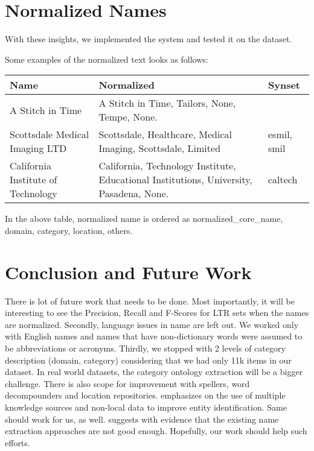 \documentclass{acm_proc_article-sp}
\begin{document}
\section{Normalized Names}
With these insights, we implemented the system and tested it on the dataset. 

Some examples of the normalized text looks as follows:

\begin{center}
  \begin{tabular}{ |p{2cm} | p{3cm} | p{2cm} | }
    \hline
    Name & Normalized & Synset \\ \hline
    A Stitch in Time & A Stitch in Time, Tailors, None, Tempe, None. &  \\ \hline
    Scottsdale Medical Imaging LTD & Scottsdale, Healthcare, Medical  Imaging, Scottsdale, Limited & esmil, smil  \\ \hline
    California Institute of Technology & California, Technology Institute, Educational Institutions, University, Pasadena, None. & caltech \\ \hline
  \end{tabular}
\end{center}

In the above table, normalized name is ordered as
normalized\_core\_name, domain, category, location, others.

\section{Conclusion and Future Work}
There is lot of future work that needs to be done. Most importantly, it will be interesting to see the Precision, Recall and F-Scores for LTR sets when the names are normalized. Secondly, language issues in name are left out. We worked only with English names and names that have non-dictionary words were assumed to be abbreviations or acronyms. Thirdly, we stopped with 2 levels of category description (domain, category) considering that we had only 11k items in our dataset. In real world datasets, the category ontology extraction will be a bigger challenge. There is also scope for improvement with spellers, word decompounders and location repositories. \cite{vilain-huggins-wellner:2009:RANLP09} emphasizes on the use of multiple knowledge sources and non-local data to improve entity identification. Same should work for us, as well. \cite{Vilain:2007:EEB:1614108.1614154} suggests with evidence that the existing name extraction approaches are not good enough. Hopefully, our work should help such efforts. 
\end{document}
